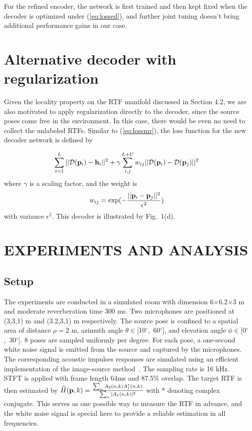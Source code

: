 \documentclass{article}
\begin{document}
For the refined encoder, the network is first trained and then kept fixed when the decoder is optimized under (\ref{eq:lossed}), and further joint tuning doesn't bring additional performance gains in our case.


\section{Alternative decoder with regularization}


Given the locality property on the RTF manifold discussed in Section 4.2, we are also motivated to apply regularization directly to the decoder, since the source poses come free in the environment. In this case, there would be even no need to collect the unlabeled RTFs. Similar to (\ref{eq:lossmr}), the loss function for the new decoder network is defined by

\begin{equation}\label{eq:lossdr}
\sum_{i=1}^{L}||\mathcal{D}({\bf p}_i)-{\bf h}_i||^2 + \gamma \sum_{i,j}^{L+U}w_{ij}||\mathcal{D}({\bf p}_i)-\mathcal{D}({\bf p}_j)||^2
\end{equation}
where $\gamma$ is a scaling factor, and the weight is
\begin{equation}\label{eq:wij2}
  w_{ij} = \exp(-\frac{||{\bf p}_i-{\bf p}_j||^2}{\epsilon^2})
\end{equation}
with variance $\epsilon^2$. This decoder is illustrated by Fig.~1(d).


\section{EXPERIMENTS AND ANALYSIS}

\subsection{Setup}


The experiments are conducted in a simulated room with dimension 6$\times$6.2$\times$3 m and moderate reverberation time 300 ms. Two microphones are positioned at (3,3,1) m and (3.2,3,1) m respectively. The source pose is confined to a spatial area of distance $\rho=2$ m, azimuth angle $\theta \in$[10$^{\circ}$,~60$^{\circ}$], and elevation angle $\phi \in$[0$^{\circ}$,~30$^{\circ}$]. 8 poses are sampled uniformly per degree. For each pose, a one-second white noise signal is emitted from the source and captured by the microphones. The corresponding acoustic impulses responses are simulated using an efficient implementation of the image-source method~\cite{rirge}. The sampling rate is 16 kHz. STFT is applied with frame length 64ms and 87.5\% overlap. The target RTF is then estimated by $\widehat{H}({\bf p}, k)=\frac{\sum_n A_2(n, k)A_1^*(n, k)}{\sum_n |A_1(n, k)|^2}$ with $*$ denoting complex conjugate. This serves as one possible way to measure the RTF in advance, and the white noise signal is special here to provide a reliable estimation in all frequencies.
\end{document}
